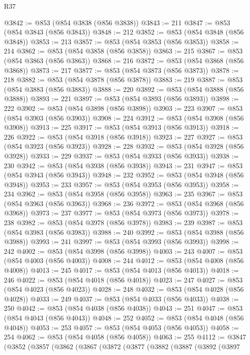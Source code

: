 \begin{lexlean}{R37}
\begin{coremodule}
@3842 := @853 (@854 @3838 (@856 @3838))
@3843 := 211
@3847 := @853 (@854 @3843 (@856 @3843))
@3848 := 212
@3852 := @853 (@854 @3848 (@856 @3848))
@3853 := 213
@3857 := @853 (@854 @3853 (@856 @3853))
@3858 := 214
@3862 := @853 (@854 @3858 (@856 @3858))
@3863 := 215
@3867 := @853 (@854 @3863 (@856 @3863))
@3868 := 216
@3872 := @853 (@854 @3868 (@856 @3868))
@3873 := 217
@3877 := @853 (@854 @3873 (@856 @3873))
@3878 := 218
@3882 := @853 (@854 @3878 (@856 @3878))
@3883 := 219
@3887 := @853 (@854 @3883 (@856 @3883))
@3888 := 220
@3892 := @853 (@854 @3888 (@856 @3888))
@3893 := 221
@3897 := @853 (@854 @3893 (@856 @3893))
@3898 := 222
@3902 := @853 (@854 @3898 (@856 @3898))
@3903 := 223
@3907 := @853 (@854 @3903 (@856 @3903))
@3908 := 224
@3912 := @853 (@854 @3908 (@856 @3908))
@3913 := 225
@3917 := @853 (@854 @3913 (@856 @3913))
@3918 := 226
@3922 := @853 (@854 @3918 (@856 @3918))
@3923 := 227
@3927 := @853 (@854 @3923 (@856 @3923))
@3928 := 228
@3932 := @853 (@854 @3928 (@856 @3928))
@3933 := 229
@3937 := @853 (@854 @3933 (@856 @3933))
@3938 := 230
@3942 := @853 (@854 @3938 (@856 @3938))
@3943 := 231
@3947 := @853 (@854 @3943 (@856 @3943))
@3948 := 232
@3952 := @853 (@854 @3948 (@856 @3948))
@3953 := 233
@3957 := @853 (@854 @3953 (@856 @3953))
@3958 := 234
@3962 := @853 (@854 @3958 (@856 @3958))
@3963 := 235
@3967 := @853 (@854 @3963 (@856 @3963))
@3968 := 236
@3972 := @853 (@854 @3968 (@856 @3968))
@3973 := 237
@3977 := @853 (@854 @3973 (@856 @3973))
@3978 := 238
@3982 := @853 (@854 @3978 (@856 @3978))
@3983 := 239
@3987 := @853 (@854 @3983 (@856 @3983))
@3988 := 240
@3992 := @853 (@854 @3988 (@856 @3988))
@3993 := 241
@3997 := @853 (@854 @3993 (@856 @3993))
@3998 := 242
@4002 := @853 (@854 @3998 (@856 @3998))
@4003 := 243
@4007 := @853 (@854 @4003 (@856 @4003))
@4008 := 244
@4012 := @853 (@854 @4008 (@856 @4008))
@4013 := 245
@4017 := @853 (@854 @4013 (@856 @4013))
@4018 := 246
@4022 := @853 (@854 @4018 (@856 @4018))
@4023 := 247
@4027 := @853 (@854 @4023 (@856 @4023))
@4028 := 248
@4032 := @853 (@854 @4028 (@856 @4028))
@4033 := 249
@4037 := @853 (@854 @4033 (@856 @4033))
@4038 := 250
@4042 := @853 (@854 @4038 (@856 @4038))
@4043 := 251
@4047 := @853 (@854 @4043 (@856 @4043))
@4048 := 252
@4052 := @853 (@854 @4048 (@856 @4048))
@4053 := 253
@4057 := @853 (@854 @4053 (@856 @4053))
@4058 := 254
@4062 := @853 (@854 @4058 (@856 @4058))
@4063 := 255
@4112 := @3847
    (@3852
      (@3857
        (@3862
          (@3867
            (@3872
              (@3877
                (@3882
                  (@3887
                    (@3892
                      (@3897

\end{coremodule}
\end{lexlean}
